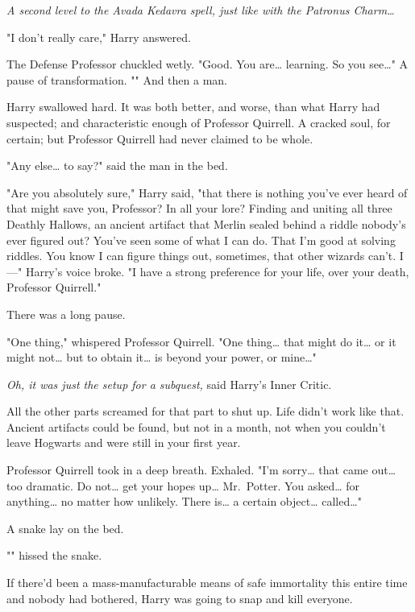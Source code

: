 \emph{A second level to the Avada Kedavra spell, just like with the Patronus 
Charm{\ldots}}

"I don't really care," Harry answered.

The Defense Professor chuckled wetly. "Good. You are{\ldots} learning. So you 
see{\ldots}" A pause of transformation. "" And then a man.

Harry swallowed hard. It was both better, and worse, than what Harry had 
suspected; and characteristic enough of Professor Quirrell. A cracked soul, for 
certain; but Professor Quirrell had never claimed to be whole.

"Any else{\ldots} to say?" said the man in the bed.

"Are you absolutely sure," Harry said, "that there is nothing you've ever heard 
of that might save you, Professor? In all your lore? Finding and uniting all 
three Deathly Hallows, an ancient artifact that Merlin sealed behind a riddle 
nobody's ever figured out? You've seen some of what I can do. That I'm good at 
solving riddles. You know I can figure things out, sometimes, that other 
wizards can't. I---" Harry's voice broke. "I have a strong preference for your 
life, over your death, Professor Quirrell."

There was a long pause.

"One thing," whispered Professor Quirrell. "One thing{\ldots} that might do 
it{\ldots} or it might not{\ldots} but to obtain it{\ldots} is beyond your 
power, or mine{\ldots}"

\emph{Oh, it was just the setup for a subquest,} said Harry's Inner Critic.

All the other parts screamed for that part to shut up. Life didn't work like 
that. Ancient artifacts could be found, but not in a month, not when you 
couldn't leave Hogwarts and were still in your first year.

Professor Quirrell took in a deep breath. Exhaled. "I'm sorry{\ldots} that came 
out{\ldots} too dramatic. Do not{\ldots} get your hopes up{\ldots} Mr.~Potter. 
You asked{\ldots} for anything{\ldots} no matter how unlikely. There is{\ldots} 
a certain object{\ldots} called{\ldots}"

A snake lay on the bed.

"" hissed the snake.

If there'd been a mass-manufacturable means of safe immortality this entire 
time and nobody had bothered, Harry was going to snap and kill everyone.


